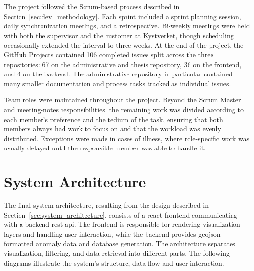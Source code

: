 The project followed the Scrum-based process described in Section~\ref{sec:dev_methodology}. 
Each sprint included a sprint planning session, daily synchronization meetings, and a retrospective. Bi-weekly meetings were held with both the supervisor and the customer at Kystverket, though scheduling occasionally extended the interval to three weeks. At the end of the project, the GitHub Projects contained 106 completed issues split across the three repositories: 67 on the administrative and thesis repository, 36 on the frontend, and 4 on the backend. The administrative repository in particular contained many smaller documentation and process tasks tracked as individual issues.

Team roles were maintained throughout the project. Beyond the Scrum Master and meeting-notes responsibilities, the remaining work was divided according to each member's preference and the tedium of the task, ensuring that both members always had work to focus on and that the workload was evenly distributed. Exceptions were made in cases of illness, where role-specific work was usually delayed until the responsible member was able to handle it.


\section{System Architecture}
\label{sec:results_system_architecture}

The final system architecture, resulting from the design described in Section~\ref{sec:system_architecture}, consists of a \gls{react} frontend communicating with a backend \acrshort{rest} \acrshort{api}. The frontend is responsible for rendering visualization layers and handling user interaction, while the backend provides \acrshort{geojson}-formatted anomaly data and database generation. The architecture separates visualization, filtering, and data retrieval into different parts. The following diagrams illustrate the system's structure, data flow and user interaction.


